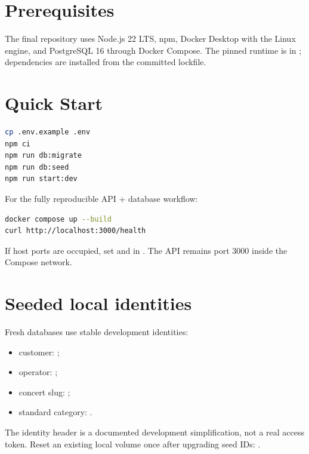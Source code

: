 \section{Prerequisites}
The final repository uses Node.js 22 LTS, npm, Docker Desktop with the Linux
engine, and PostgreSQL 16 through Docker Compose. The pinned runtime is in
; dependencies are installed from the committed lockfile.

\section{Quick Start}
\begin{lstlisting}[language=bash,caption={Fresh local setup}]
cp .env.example .env
npm ci
npm run db:migrate
npm run db:seed
npm run start:dev
\end{lstlisting}

For the fully reproducible API + database workflow:

\begin{lstlisting}[language=bash,caption={Docker Compose setup}]
docker compose up --build
curl http://localhost:3000/health
\end{lstlisting}

If host ports are occupied, set  and
 in . The API remains port 3000 inside
the Compose network.

\section{Seeded local identities}
Fresh databases use stable development identities:

\begin{itemize}[nosep,leftmargin=*]
  \item customer: ;
  \item operator: ;
  \item concert slug: ;
  \item standard category: .
\end{itemize}

The identity header is a documented development simplification, not a real
access token. Reset an existing local volume once after upgrading seed IDs:
.

